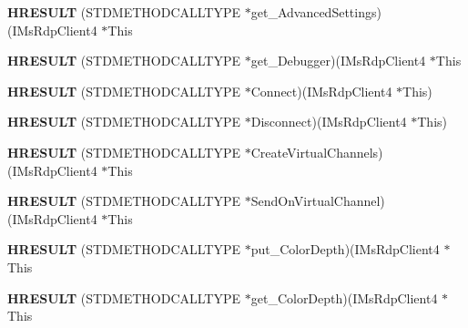 \begin{DoxyCompactItemize}
\item 
\mbox{\label{struct_i_ms_rdp_client4_vtbl_a5dce2262419c4fd0b4bf4e35de40142c}} 
{\bfseries H\+R\+E\+S\+U\+LT} (S\+T\+D\+M\+E\+T\+H\+O\+D\+C\+A\+L\+L\+T\+Y\+PE $\ast$get\+\_\+\+Advanced\+Settings)(I\+Ms\+Rdp\+Client4 $\ast$This
\item 
\mbox{\label{struct_i_ms_rdp_client4_vtbl_aef4f3e95b40a781ca677d7fd9153c3e0}} 
{\bfseries H\+R\+E\+S\+U\+LT} (S\+T\+D\+M\+E\+T\+H\+O\+D\+C\+A\+L\+L\+T\+Y\+PE $\ast$get\+\_\+\+Debugger)(I\+Ms\+Rdp\+Client4 $\ast$This
\item 
\mbox{\label{struct_i_ms_rdp_client4_vtbl_aaa89f698bb7e0b6812652c3681648c94}} 
{\bfseries H\+R\+E\+S\+U\+LT} (S\+T\+D\+M\+E\+T\+H\+O\+D\+C\+A\+L\+L\+T\+Y\+PE $\ast$Connect)(I\+Ms\+Rdp\+Client4 $\ast$This)
\item 
\mbox{\label{struct_i_ms_rdp_client4_vtbl_ae7fd2b4f05ad1a195fd72b654a2e29ab}} 
{\bfseries H\+R\+E\+S\+U\+LT} (S\+T\+D\+M\+E\+T\+H\+O\+D\+C\+A\+L\+L\+T\+Y\+PE $\ast$Disconnect)(I\+Ms\+Rdp\+Client4 $\ast$This)
\item 
\mbox{\label{struct_i_ms_rdp_client4_vtbl_a6b8e2e4cc807cf6876fddbda946935c2}} 
{\bfseries H\+R\+E\+S\+U\+LT} (S\+T\+D\+M\+E\+T\+H\+O\+D\+C\+A\+L\+L\+T\+Y\+PE $\ast$Create\+Virtual\+Channels)(I\+Ms\+Rdp\+Client4 $\ast$This
\item 
\mbox{\label{struct_i_ms_rdp_client4_vtbl_a6a4327f2c8cbd57c15d9a77b479ce2eb}} 
{\bfseries H\+R\+E\+S\+U\+LT} (S\+T\+D\+M\+E\+T\+H\+O\+D\+C\+A\+L\+L\+T\+Y\+PE $\ast$Send\+On\+Virtual\+Channel)(I\+Ms\+Rdp\+Client4 $\ast$This
\item 
\mbox{\label{struct_i_ms_rdp_client4_vtbl_ada46ae71ebdedd54fcfd27256ec56f2e}} 
{\bfseries H\+R\+E\+S\+U\+LT} (S\+T\+D\+M\+E\+T\+H\+O\+D\+C\+A\+L\+L\+T\+Y\+PE $\ast$put\+\_\+\+Color\+Depth)(I\+Ms\+Rdp\+Client4 $\ast$This
\item 
\mbox{\label{struct_i_ms_rdp_client4_vtbl_a52bf0bdc4ca73079da72dcb367b77b0d}} 
{\bfseries H\+R\+E\+S\+U\+LT} (S\+T\+D\+M\+E\+T\+H\+O\+D\+C\+A\+L\+L\+T\+Y\+PE $\ast$get\+\_\+\+Color\+Depth)(I\+Ms\+Rdp\+Client4 $\ast$This

\end{DoxyCompactItemize}
